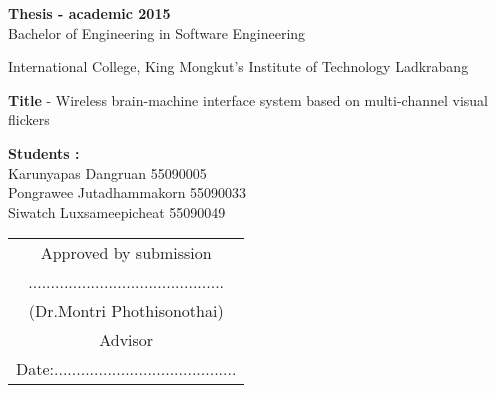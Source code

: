 \begin{approve}
\textbf{Thesis - academic 2015}\\
Bachelor of Engineering in Software Engineering

International College, King Mongkut's Institute of Technology Ladkrabang


\textbf{Title} - Wireless brain-machine interface system based on multi-channel visual flickers

\textbf{Students :}\\
Karunyapas  Dangruan  55090005\\
Pongrawee  Jutadhammakorn 55090033\\
Siwatch  Luxsameepicheat  55090049\\

\begin{flushright}
\begin{tabu}{c}

	
	Approved by submission\\
	............................................\\
	(Dr.Montri Phothisonothai)\\
	Advisor\\
	
	Date:.........................................\\
\end{tabu}   
\end{flushright}

\end{approve}
